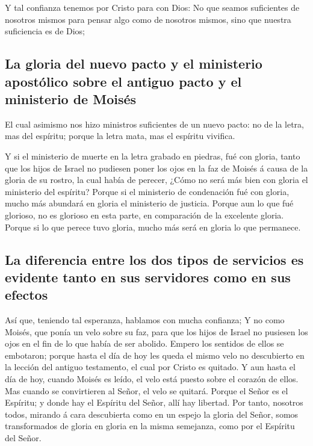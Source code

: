  Y tal confianza tenemos por Cristo para con Dios:
 No que seamos suficientes de nosotros mismos para pensar
algo como de nosotros mismos, sino que nuestra suficiencia es de Dios;

\hypertarget{la-gloria-del-nuevo-pacto-y-el-ministerio-apostuxf3lico-sobre-el-antiguo-pacto-y-el-ministerio-de-moisuxe9s}{%
\subsection{La gloria del nuevo pacto y el ministerio apostólico sobre
el antiguo pacto y el ministerio de
Moisés}\label{la-gloria-del-nuevo-pacto-y-el-ministerio-apostuxf3lico-sobre-el-antiguo-pacto-y-el-ministerio-de-moisuxe9s}}

 El cual asimismo nos hizo ministros suficientes de un
nuevo pacto: no de la letra, mas del espíritu; porque la letra mata, mas
el espíritu vivifica.

 Y si el ministerio de muerte en la letra grabado en
piedras, fué con gloria, tanto que los hijos de Israel no pudiesen poner
los ojos en la faz de Moisés á causa de la gloria de su rostro, la cual
había de perecer,  ¿Cómo no será más bien con gloria el
ministerio del espíritu?  Porque si el ministerio de
condenación fué con gloria, mucho más abundará en gloria el ministerio
de justicia.  Porque aun lo que fué glorioso, no es
glorioso en esta parte, en comparación de la excelente gloria.
 Porque si lo que perece tuvo gloria, mucho más será en
gloria lo que permanece.

\hypertarget{la-diferencia-entre-los-dos-tipos-de-servicios-es-evidente-tanto-en-sus-servidores-como-en-sus-efectos}{%
\subsection{La diferencia entre los dos tipos de servicios es evidente
tanto en sus servidores como en sus
efectos}\label{la-diferencia-entre-los-dos-tipos-de-servicios-es-evidente-tanto-en-sus-servidores-como-en-sus-efectos}}

 Así que, teniendo tal esperanza, hablamos con mucha
confianza;  Y no como Moisés, que ponía un velo sobre su
faz, para que los hijos de Israel no pusiesen los ojos en el fin de lo
que había de ser abolido.  Empero los sentidos de ellos
se embotaron; porque hasta el día de hoy les queda el mismo velo no
descubierto en la lección del antiguo testamento, el cual por Cristo es
quitado.  Y aun hasta el día de hoy, cuando Moisés es
leído, el velo está puesto sobre el corazón de ellos. 
Mas cuando se convirtieren al Señor, el velo se quitará. 
Porque el Señor es el Espíritu; y donde hay el Espíritu del Señor, allí
hay libertad.  Por tanto, nosotros todos, mirando á cara
descubierta como en un espejo la gloria del Señor, somos transformados
de gloria en gloria en la misma semejanza, como por el Espíritu del
Señor.

